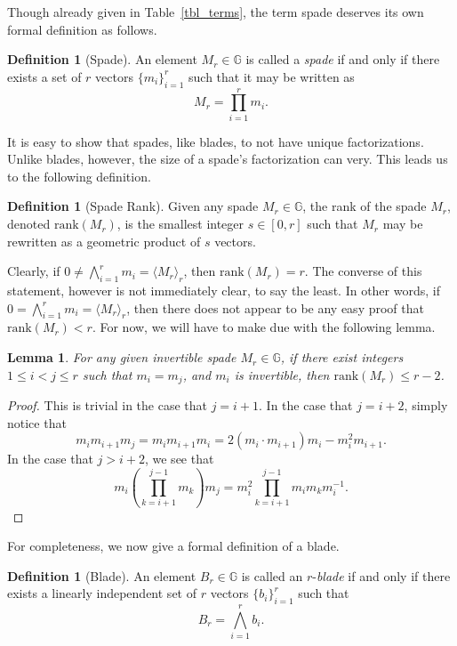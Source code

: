\documentclass{birkjour}
\newtheorem{lem}[thm]{Lemma}
\theoremstyle{definition}
\newtheorem{defn}[thm]{Definition}
\theoremstyle{remark}
\numberwithin{equation}{section}
\newcommand{\G}{\mathbb{G}}
\newcommand{\rank}{\mbox{rank}}
\begin{document}
Though already given in Table~\ref{tbl_terms}, the term spade deserves its own formal definition as follows.
\begin{defn}[Spade]
An element $M_r\in\G$ is called a \emph{spade} if and only if there exists a set of $r$ vectors $\{m_i\}_{i=1}^r$
such that it may be written as
\begin{equation}\label{equ_M_r}
M_r = \prod_{i=1}^r m_i.
\end{equation}
\end{defn}
It is easy to show that spades, like blades, to not have unique factorizations.  Unlike blades, however, the
size of a spade's factorization can very.  This leads us to the following definition.
\begin{defn}[Spade Rank]
Given any spade $M_r\in\G$, the rank of the spade $M_r$, denoted $\rank(M_r)$, is the
smallest integer $s\in[0,r]$ such that $M_r$ may be rewritten as a geometric product of $s$ vectors.
\end{defn}
Clearly, if $0\neq\bigwedge_{i=1}^r m_i=\langle M_r\rangle_r$, then $\rank(M_r)=r$.
The converse of this statement, however is not immediately clear, to say the least.
In other words, if $0=\bigwedge_{i=1}^r m_i=\langle M_r\rangle_r$, then there does not
appear to be any easy proof that $\rank(M_r)<r$.  For now, we will have to make due with the following lemma.
\begin{lem}\label{lem_spade_no_dup_in_factorization}
For any given invertible spade $M_r\in\G$, if there exist integers $1\leq i<j\leq r$ such that $m_i=m_j$, and $m_i$ is invertible, then $\rank(M_r)\leq r-2$.
\end{lem}
\begin{proof}
This is trivial in the case that $j=i+1$.  In the case that $j=i+2$, simply notice that
\begin{equation*}
m_im_{i+1}m_j = m_im_{i+1}m_i = 2(m_i\cdot m_{i+1})m_i-m_i^2 m_{i+1}.
\end{equation*}
In the case that $j>i+2$, we see that
\begin{equation*}
m_i\left(\prod_{k=i+1}^{j-1}m_k\right)m_j = m_i^2\prod_{k=i+1}^{j-1}m_im_km_i^{-1}.
\end{equation*}
\end{proof}

For completeness, we now give a formal definition of a blade.
\begin{defn}[Blade]
An element $B_r\in\G$ is called an $r$-\emph{blade} if and only if there exists a linearly independent set of $r$
vectors $\{b_i\}_{i=1}^r$ such that
\begin{equation}\label{equ_B_r}
B_r = \bigwedge_{i=1}^r b_i.
\end{equation}
\end{defn}
\end{document}
